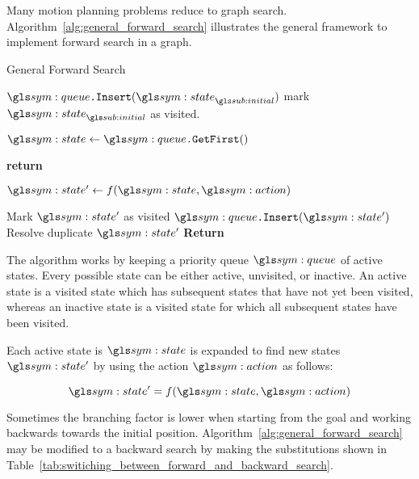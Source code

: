 		Many motion planning problems reduce to graph search.
		Algorithm~\ref{alg:general_forward_search}  illustrates the general framework to implement forward
		search in a graph.

		\begin{algorithm}[ht]
			\caption{General Forward Search}\label{alg:general_forward_search}
			\begin{algorithmic}[1]

					\State{} $\queue\code{.Insert}(\state_{\initial})$
					\State{} mark $\state_{\initial}$ as visited.

					\While{$\queue \neq \emptyset$}

						\State{} $\state \gets \queue\code{.GetFirst}()$
						\If{$\state \in \statespace_{\goal}$}

							\State{} \textbf{return} 

						\EndIf{}

						\ForAll{$\action \in \actionspace(\state)$}
							\State{} $\state' \gets f(\state, \action)$

								\State{} Mark $\state'$ as visited
								\State{} $\queue\code{.Insert}(\state')$
							\Else{}
								\State{} Resolve duplicate $\state'$
							\EndIf{}
						\EndFor{}
					\EndWhile{}
					\State{} \textbf{Return} 
				\EndProcedure{}
			\end{algorithmic}
		\end{algorithm}

		The algorithm works by keeping a priority queue $\queue$ of active
		states. Every possible state can be either active, unvisited, or
		inactive. An active state is a visited state which has subsequent states
		that have not yet been visited, whereas an inactive state is a visited
		state for which all subsequent states have been visited.

		Each active state is $\state$ is expanded to find new states $\state'$
		by using the action $\action$ as follows:

		\begin{equation}
			\state' = f(\state, \action)
		\end{equation}

		Sometimes the branching factor is lower when starting from the goal and
		working backwards towards the initial position.
		Algorithm~\ref{alg:general_forward_search} may be modified to a backward
		search by making the substitutions shown in
		Table~\ref{tab:switiching_between_forward_and_backward_search}.%

